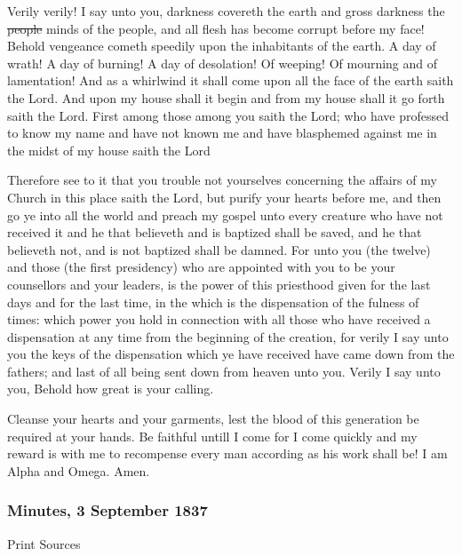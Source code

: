 					Verily verily! I say unto you, darkness covereth the earth and gross darkness the \sout{people} minds of the people, and all flesh has become corrupt before my face! Behold vengeance cometh speedily upon the inhabitants of the earth. A day of wrath! A day of burning! A day of desolation! Of weeping! Of mourning and of lamentation! And as a whirlwind it shall come upon all the face of the earth saith the Lord. And upon my house shall it begin and from my house shall it go forth saith the Lord. First among those among you saith the Lord; who have professed to know my name and have not known me and have blasphemed against me in the midst of my house saith the Lord

					Therefore see to it that you trouble not yourselves concerning the affairs of my Church in this place saith the Lord, but purify your hearts before me, and then go ye into all the world and preach my gospel unto every creature who have not received it and he that believeth and is baptized shall be saved, and he that believeth not, and is not baptized shall be damned. For unto you (the twelve) and those (the first presidency) who are appointed with you to be your counsellors and your leaders, is the power of this priesthood given for the last days and for the last time, in the which is the dispensation of the fulness of times: which power you hold in connection with all those who have received a dispensation at any time from the beginning of the creation, for verily I say unto you the keys of the dispensation which ye have received have came down from the fathers; and last of all being sent down from heaven unto you. Verily I say unto you, Behold how great is your calling.

					Cleanse your hearts and your garments, lest the blood of this generation be required at your hands. Be faithful untill I come for I come quickly and my reward is with me to recompense every man according as his work shall be! I am Alpha and Omega. Amen.
					
		\subsubsection{Minutes, 3 September 1837}
			\label{EMS-1837-JS-3-SEP-1837}
			
			\begin{description}
					\item[Print Sources]
				\end{description}

